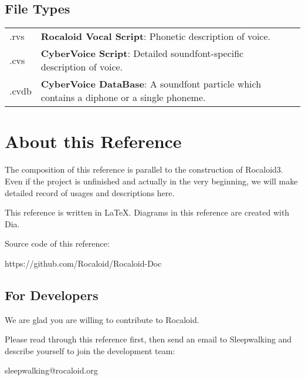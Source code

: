         \newpage

\subsection{File Types}

        \begin{tabular}{lll}
        	.rvs & \parbox{11cm}{\textbf{Rocaloid Vocal Script}: Phonetic description of voice.}\\
        	.cvs & \parbox{11cm}{\textbf{CyberVoice Script}: Detailed soundfont-specific description of voice.}\\
        	.cvdb & \parbox{11cm}{\textbf{CyberVoice DataBase}: A soundfont particle which contains a diphone or a single phoneme.}\\
        \end{tabular}

\section{About this Reference}\indent

        The composition of this reference is parallel to the construction of Rocaloid3. Even if the project is unfinished and actually in the very beginning, we will make detailed record of usages and descriptions here.
        
        This reference is written in \LaTeX. Diagrams in this reference are created with Dia.
        
        Source code of this reference:
        
        https://github.com/Rocaloid/Rocaloid-Doc

\subsection{For Developers}\indent

        We are glad you are willing to contribute to Rocaloid.
        
        Please read through this reference first, then send an email to Sleepwalking and describe yourself to join the development team:
        
        \bigskip
        
        sleepwalking@rocaloid.org
        
        \bigskip

